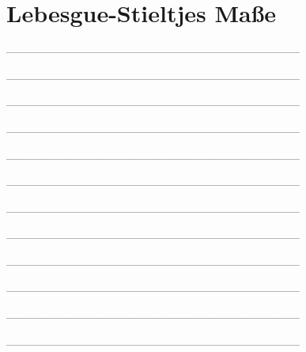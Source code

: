 \setcounter{exercise}{0}

\section{Lebesgue-Stieltjes Maße}

--------------------------------------------------------------------------------



--------------------------------------------------------------------------------



--------------------------------------------------------------------------------



--------------------------------------------------------------------------------



--------------------------------------------------------------------------------



--------------------------------------------------------------------------------



--------------------------------------------------------------------------------



--------------------------------------------------------------------------------



--------------------------------------------------------------------------------



--------------------------------------------------------------------------------



--------------------------------------------------------------------------------



--------------------------------------------------------------------------------
